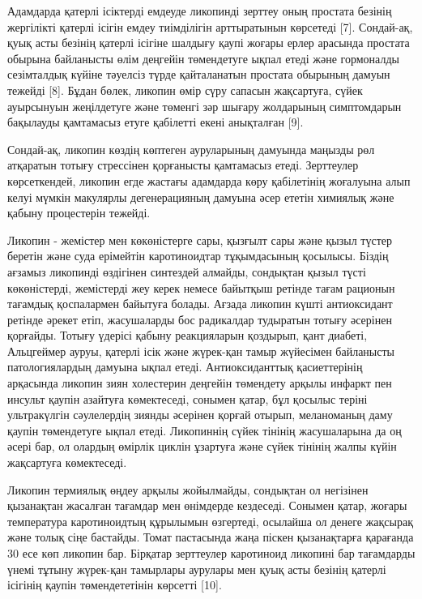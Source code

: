 Адамдарда қатерлі ісіктерді емдеуде ликопинді зерттеу оның простата
безінің жергілікті қатерлі ісігін емдеу тиімділігін арттыратынын
көрсетеді {[}7{]}. Сондай-ақ, қуық асты безінің қатерлі ісігіне шалдығу
қаупі жоғары ерлер арасында простата обырына байланысты өлім деңгейін
төмендетуге ықпал етеді және гормоналды сезімталдық күйіне тәуелсіз
түрде қайталанатын простата обырының дамуын тежейді {[}8{]}. Бұдан
бөлек, ликопин өмір сүру сапасын жақсартуға, сүйек ауырсынуын
жеңілдетуге және төменгі зәр шығару жолдарының симптомдарын бақылауды
қамтамасыз етуге қабілетті екені анықталған {[}9{]}.

Сондай-ақ, ликопин көздің көптеген ауруларының дамуында маңызды рөл
атқаратын тотығу стрессінен қорғанысты қамтамасыз етеді. Зерттеулер
көрсеткендей, ликопин егде жастағы адамдарда көру қабілетінің жоғалуына
алып келуі мүмкін макулярлы дегенерацияның дамуына әсер ететін химиялық
және қабыну процестерін тежейді.

Ликопин - жемістер мен көкөністерге сары, қызғылт сары және қызыл түстер
беретін және суда ерімейтін каротиноидтар тұқымдасының қосылысы. Біздің
ағзамыз ликопинді өздігінен синтездей алмайды, сондықтан қызыл түсті
көкөністерді, жемістерді жеу керек немесе байытқыш ретінде тағам
рационын тағамдық қоспалармен байытуға болады. Ағзада ликопин күшті
антиоксидант ретінде әрекет етіп, жасушаларды бос радикалдар тудыратын
тотығу әсерінен қорғайды. Тотығу үдерісі қабыну реакцияларын қоздырып,
қант диабеті, Альцгеймер ауруы, қатерлі ісік және жүрек-қан тамыр
жүйесімен байланысты патологиялардың дамуына ықпал етеді.
Антиоксиданттық қасиеттерінің арқасында ликопин зиян холестерин деңгейін
төмендету арқылы инфаркт пен инсульт қаупін азайтуға көмектеседі,
сонымен қатар, бұл қосылыс теріні ультракүлгін сәулелердің зиянды
әсерінен қорғай отырып, меланоманың даму қаупін төмендетуге ықпал етеді.
Ликопиннің сүйек тінінің жасушаларына да оң әсері бар, ол олардың
өмірлік циклін ұзартуға және сүйек тінінің жалпы күйін жақсартуға
көмектеседі.

Ликопин термиялық өңдеу арқылы жойылмайды, сондықтан ол негізінен
қызанақтан жасалған тағамдар мен өнімдерде кездеседі. Сонымен қатар,
жоғары температура каротиноидтың құрылымын өзгертеді, осылайша ол денеге
жақсырақ және толық сіңе бастайды. Томат пастасында жаңа піскен
қызанақтарға қарағанда 30 есе көп ликопин бар. Бірқатар зерттеулер
каротиноид ликопині бар тағамдарды үнемі тұтыну жүрек-қан тамырлары
аурулары мен қуық асты безінің қатерлі ісігінің қаупін төмендететінін
көрсетті {[}10{]}.

